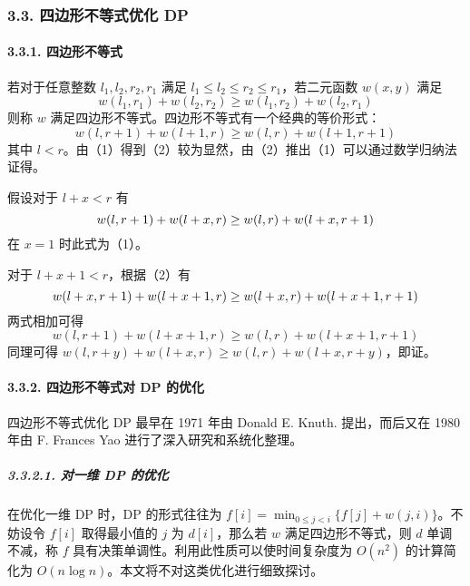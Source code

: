 \begin{Shaded}
\begin{Highlighting}[]
\OperatorTok{{-}{-};}
        \OperatorTok{\}}
\OperatorTok{[++}\OperatorTok{]} \OperatorTok{=}\OperatorTok{;}
    \OperatorTok{\}}
\OperatorTok{(}\OperatorTok{,}\OperatorTok{[}\OperatorTok{]);}
     \OperatorTok{;}
\OperatorTok{\}}
\end{Highlighting}
\end{Shaded}

\subsubsection{3.3. 四边形不等式优化 DP}

\paragraph{3.3.1. 四边形不等式}

若对于任意整数 \(l_1,l_2,r_2,r_1\) 满足
\(l_1\le l_2\le r_2\le r_1\)，若二元函数 \(w(x,y)\) 满足 \[
w(l_1,r_1)+w(l_2,r_2)\ge w(l_1,r_2)+w(l_2,r_1)\tag{1}
\] 则称 \(w\) 满足四边形不等式。四边形不等式有一个经典的等价形式： \[
w(l,r+1)+w(l+1,r)\ge w(l,r)+w(l+1,r+1)\tag{2}
\] 其中
\(l\lt r\)。由（1）得到（2）较为显然，由（2）推出（1）可以通过数学归纳法证得。

假设对于 \(l+x\lt r\) 有 \[
w(l,r+1)+w(l+x,r)\ge w(l,r)+w(l+x,r+1)\\
\] 在 \(x=1\) 时此式为（1）。

对于 \(l+x+1\lt r\)，根据（2）有 \[
w(l+x,r+1)+w(l+x+1,r)\ge w(l+x,r)+w(l+x+1,r+1)\\
\] 两式相加可得 \[
w(l,r+1)+w(l+x+1,r)\ge w(l,r)+w(l+x+1,r+1)
\] 同理可得 \(w(l,r+y)+w(l+x,r)\ge w(l,r)+w(l+x,r+y)\)，即证。

\paragraph{3.3.2. 四边形不等式对 DP 的优化}

四边形不等式优化 DP 最早在 1971 年由 Donald E. Knuth. 提出，而后又在
1980 年由 F. Frances Yao 进行了深入研究和系统化整理。

\subparagraph{3.3.2.1. 对一维 DP 的优化}

在优化一维 DP 时，DP 的形式往往为
\(f[i]=\min_{0\le j\lt i}\{f[j]+w(j,i)\}\)。不妨设令 \(f[i]\)
取得最小值的 \(j\) 为 \(d[i]\)，那么若 \(w\) 满足四边形不等式，则 \(d\)
单调不减，称 \(f\) 具有决策单调性。利用此性质可以使时间复杂度为
\(O(n^2)\) 的计算简化为 \(O(n\log n)\)。本文将不对这类优化进行细致探讨。

